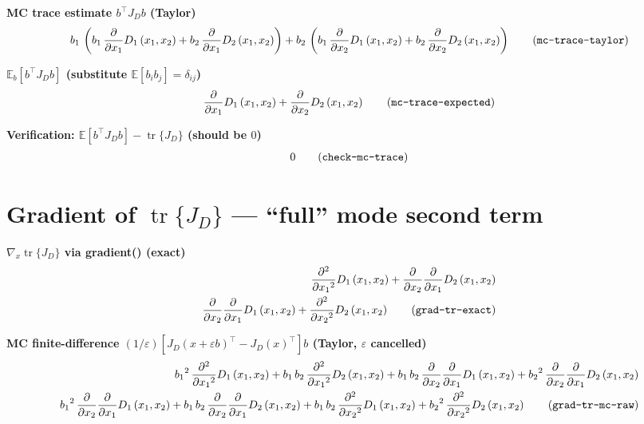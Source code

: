 \documentclass{article}
\begin{document}
\noindent\textbf{MC trace estimate $b^\top J_D b$ (Taylor)}
\begin{align}
  b_{1}\,\left(b_{1}\,\frac{\partial }{\partial x_{1}} D_{1}\left(x_{1},x_{2}\right)+b_{2}\,\frac{\partial }{\partial x_{1}} D_{2}\left(x_{1},x_{2}\right)\right)+b_{2}\,\left(b_{1}\,\frac{\partial }{\partial x_{2}} D_{1}\left(x_{1},x_{2}\right)+b_{2}\,\frac{\partial }{\partial x_{2}} D_{2}\left(x_{1},x_{2}\right)\right) \tag{\texttt{mc-trace-taylor}}
\end{align}

\noindent\textbf{$\mathbb{E}_b[b^\top J_D b]$  (substitute $\mathbb{E}[b_i b_j]=\delta_{ij}$)}
\begin{align}
  \frac{\partial }{\partial x_{1}} D_{1}\left(x_{1},x_{2}\right)+\frac{\partial }{\partial x_{2}} D_{2}\left(x_{1},x_{2}\right) \tag{\texttt{mc-trace-expected}}
\end{align}

\noindent\textbf{Verification: $\mathbb{E}[b^\top J_D b] - \operatorname{tr}\{J_D\}$  (should be $0$)}
\begin{align}
  0 \tag{\texttt{check-mc-trace}}
\end{align}

\section{Gradient of $\operatorname{tr}\{J_D\}$ --- ``full'' mode second term}

\noindent\textbf{$\nabla_x \operatorname{tr}\{J_D\}$  via gradient()  (exact)}
\begin{align}
  \frac{\partial ^2}{\partial {x_{1}}^2} D_{1}\left(x_{1},x_{2}\right)+\frac{\partial }{\partial x_{2}} \frac{\partial }{\partial x_{1}} D_{2}\left(x_{1},x_{2}\right) \\
  \frac{\partial }{\partial x_{2}} \frac{\partial }{\partial x_{1}} D_{1}\left(x_{1},x_{2}\right)+\frac{\partial ^2}{\partial {x_{2}}^2} D_{2}\left(x_{1},x_{2}\right)
  \tag{\texttt{grad-tr-exact}}
\end{align}

\noindent\textbf{MC finite-difference  $(1/\varepsilon)[J_D(x{+}\varepsilon b)^\top{-}J_D(x)^\top]b$  (Taylor, $\varepsilon$ cancelled)}
\begin{align}
  {b_{1}}^2\,\frac{\partial ^2}{\partial {x_{1}}^2} D_{1}\left(x_{1},x_{2}\right)+b_{1}\,b_{2}\,\frac{\partial ^2}{\partial {x_{1}}^2} D_{2}\left(x_{1},x_{2}\right)+b_{1}\,b_{2}\,\frac{\partial }{\partial x_{2}} \frac{\partial }{\partial x_{1}} D_{1}\left(x_{1},x_{2}\right)+{b_{2}}^2\,\frac{\partial }{\partial x_{2}} \frac{\partial }{\partial x_{1}} D_{2}\left(x_{1},x_{2}\right) \\
  {b_{1}}^2\,\frac{\partial }{\partial x_{2}} \frac{\partial }{\partial x_{1}} D_{1}\left(x_{1},x_{2}\right)+b_{1}\,b_{2}\,\frac{\partial }{\partial x_{2}} \frac{\partial }{\partial x_{1}} D_{2}\left(x_{1},x_{2}\right)+b_{1}\,b_{2}\,\frac{\partial ^2}{\partial {x_{2}}^2} D_{1}\left(x_{1},x_{2}\right)+{b_{2}}^2\,\frac{\partial ^2}{\partial {x_{2}}^2} D_{2}\left(x_{1},x_{2}\right)
  \tag{\texttt{grad-tr-mc-raw}}
\end{align}
\end{document}
